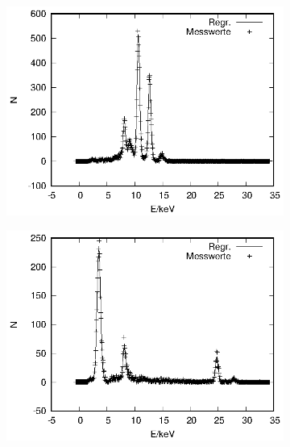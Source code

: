 \begin{figure}[!h]
  \ContinuedFloat
  \centering
  \begin{subfigure}[h]{0.5\textwidth}
    \centering
    \includegraphics{data/Massenanteil/pb.eps}
  \end{subfigure}%
  \begin{subfigure}[h]{0.5\textwidth}
    \centering
    \includegraphics{data/Massenanteil/sn.eps}
  \end{subfigure}
  \begin{subfigure}[h]{0.5\textwidth}
    \centering

\end{subfigure}
\end{figure}
